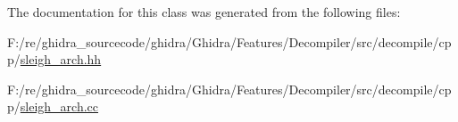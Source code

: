 The documentation for this class was generated from the following files\+:\begin{DoxyCompactItemize}
\item 
F\+:/re/ghidra\+\_\+sourcecode/ghidra/\+Ghidra/\+Features/\+Decompiler/src/decompile/cpp/\mbox{\hyperlink{sleigh__arch_8hh}{sleigh\+\_\+arch.\+hh}}\item 
F\+:/re/ghidra\+\_\+sourcecode/ghidra/\+Ghidra/\+Features/\+Decompiler/src/decompile/cpp/\mbox{\hyperlink{sleigh__arch_8cc}{sleigh\+\_\+arch.\+cc}}\end{DoxyCompactItemize}
